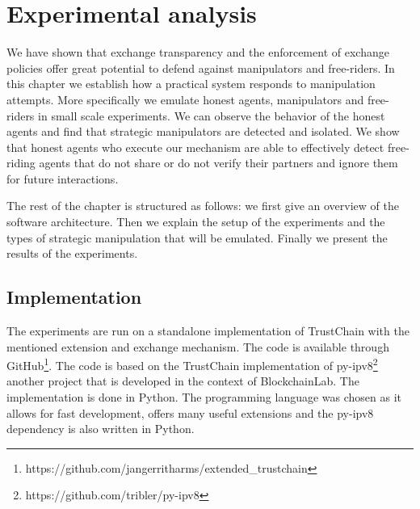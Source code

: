 \chapter{Experimental analysis}
We have shown that exchange transparency and the enforcement of exchange policies offer great potential
to defend against manipulators and free-riders. In this chapter we establish
how a practical system responds to manipulation attempts. More specifically we emulate honest agents,
manipulators and free-riders in small scale experiments. We can observe the behavior of the 
honest agents and find that strategic manipulators are detected and isolated. We show that honest agents who
execute our mechanism are able to effectively detect free-riding agents that do not share or do not verify their partners 
and ignore them for future interactions.

The rest of the chapter is structured as follows: we first give an overview of the software 
architecture. Then we explain the setup of the experiments and the types of strategic manipulation
that will be emulated. Finally we present the results of the experiments.


\section{Implementation}
The experiments are run on a standalone implementation of TrustChain with the mentioned extension
and exchange mechanism. The code is available through GitHub\footnote{https://github.com/jangerritharms/extended\_trustchain}.
The code is based on the TrustChain implementation of py-ipv8\footnote{https://github.com/tribler/py-ipv8}
another project that is developed in the context of BlockchainLab. The implementation is done in 
Python. The programming language was chosen as it allows for fast development,
offers many useful extensions and the py-ipv8 dependency is also written in Python. 

